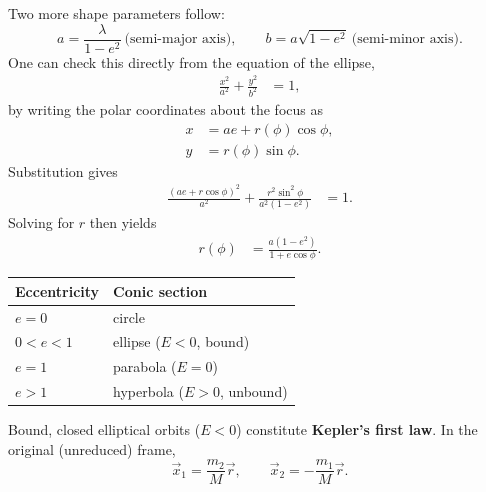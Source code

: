 \documentclass[11pt]{article}
\newcommand{\vecr}{\vec r}
\newcommand{\vecx}{\vec x}
\begin{document}
\begin{figure}[H]
	\end{figure}
Two more shape parameters follow:
\[
a=\frac{\lambda}{1-e^2}\ \text{(semi-major axis)}, \qquad b = a\sqrt{1-e^2}\ \text{(semi-minor axis)}.
\]
One can check this directly from the equation of the ellipse,
\begin{align}
\frac{x^2}{a^2}+\frac{y^2}{b^2} &= 1,
\end{align}
by writing the polar coordinates about the focus as
\begin{align}
x &= ae+r(\phi)\cos\phi,\\
y &= r(\phi)\sin\phi.
\end{align}
Substitution gives
\begin{align}
\frac{(ae+r\cos\phi)^2}{a^2}+\frac{r^2\sin^2\phi}{a^2(1-e^2)}&=1.
\end{align}
Solving for \(r\) then yields
\begin{align}
r(\phi)&=\frac{a(1-e^2)}{1+e\cos\phi}.
\end{align}

\begin{center}
\begin{tabular}{@{}ll@{}}
\toprule
Eccentricity & Conic section\\
\midrule
$e=0$ & circle\\
$0<e<1$ & ellipse ($E<0$, bound)\\
$e=1$ & parabola ($E=0$)\\
$e>1$ & hyperbola ($E>0$, unbound)\\
\bottomrule
\end{tabular}
\end{center}
Bound, closed elliptical orbits ($E<0$) constitute \textbf{Kepler's first law}. In the original (unreduced) frame,
\[
\vecx_1=\frac{m_2}{M}\vecr,\qquad \vecx_2=-\frac{m_1}{M}\vecr.
\]
\end{document}
